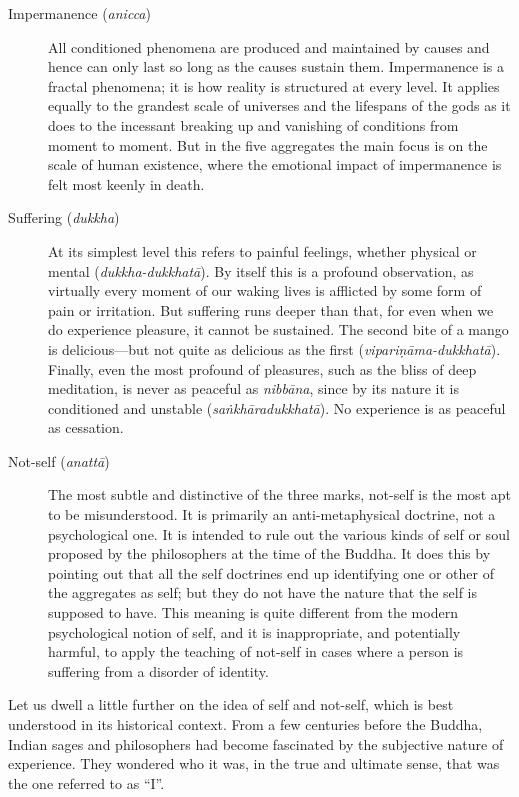 \documentclass[12pt,openany]{book}%
\begin{document}
\begin{description}%
\item[Impermanence (\textit{anicca})] All conditioned phenomena are produced and maintained by causes and hence can only last so long as the causes sustain them. Impermanence is a fractal phenomena; it is how reality is structured at every level. It applies equally to the grandest scale of universes and the lifespans of the gods as it does to the incessant breaking up and vanishing of conditions from moment to moment. But in the five aggregates the main focus is on the scale of human existence, where the emotional impact of impermanence is felt most keenly in death.%
\item[Suffering (\textit{dukkha})] At its simplest level this refers to painful feelings, whether physical or mental (\textit{dukkha-\textsanskrit{dukkhatā}}). By itself this is a profound observation, as virtually every moment of our waking lives is afflicted by some form of pain or irritation. But suffering runs deeper than that, for even when we do experience pleasure, it cannot be sustained. The second bite of a mango is delicious—but not quite as delicious as the first (\textit{\textsanskrit{vipariṇāma}-\textsanskrit{dukkhatā}}). Finally, even the most profound of pleasures, such as the bliss of deep meditation, is never as peaceful as \textit{\textsanskrit{nibbāna}}, since by its nature it is conditioned and unstable (\textit{\textsanskrit{saṅkhāradukkhatā}}). No experience is as peaceful as cessation.%
\item[Not-self (\textit{\textsanskrit{anattā}})] The most subtle and distinctive of the three marks, not-self is the most apt to be misunderstood. It is primarily an anti-metaphysical doctrine, not a psychological one. It is intended to rule out the various kinds of self or soul proposed by the philosophers at the time of the Buddha. It does this by pointing out that all the self doctrines end up identifying one or other of the aggregates as self; but they do not have the nature that the self is supposed to have. This meaning is quite different from the modern psychological notion of self, and it is inappropriate, and potentially harmful, to apply the teaching of not-self in cases where a person is suffering from a disorder of identity.%
\end{description}

Let us dwell a little further on the idea of self and not-self, which is best understood in its historical context. From a few centuries before the Buddha, Indian sages and philosophers had become fascinated by the subjective nature of experience. They wondered who it was, in the true and ultimate sense, that was the one referred to as “I”.
\end{document}
